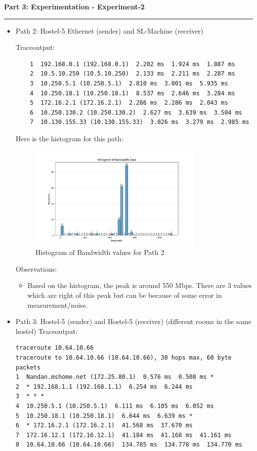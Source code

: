 \documentclass[a4paper,12pt]{article}
\newenvironment{solution}[2][]{%
    \begin{mdframed}[linecolor=blue!70!black, linewidth=2pt, roundcorner=10pt, backgroundcolor=yellow!10!white, skipabove=12pt, skipbelow=12pt]%
        \textbf{\large #2}
        \par\noindent\rule{\textwidth}{0.4pt}
}{
    \end{mdframed}
}
\begin{document}
\begin{solution}{Part 3: Experimentation - Experiment-2}
\begin{itemize}
        \item Path 2: Hostel-5 Ethernet (sender) and SL-Machine (receiver)
        
        Traceoutput:
\begin{verbatim}
    1  192.168.0.1 (192.168.0.1)  2.202 ms  1.924 ms  1.887 ms
    2  10.5.10.250 (10.5.10.250)  2.133 ms  2.211 ms  2.287 ms
    3  10.250.5.1 (10.250.5.1)  2.810 ms  3.001 ms  5.935 ms
    4  10.250.18.1 (10.250.18.1)  8.537 ms  2.646 ms  3.284 ms
    5  172.16.2.1 (172.16.2.1)  2.286 ms  2.286 ms  2.043 ms
    6  10.250.130.2 (10.250.130.2)  2.627 ms  3.639 ms  3.504 ms
    7  10.130.155.33 (10.130.155.33)  3.026 ms  3.279 ms  2.985 ms
\end{verbatim}


Here is the histogram for this path:
\begin{figure}[H]
    \centering
    \includegraphics[width=0.8\textwidth]{histograms/part3-e2-path2}
    \caption{Histogram of Bandwidth values for Path 2}
\end{figure}

Observations:
\begin{itemize}
    \item Based on the histogram, the peak is around 550 Mbps. There are 3 values which are right of this peak but can be because of some error in measurement/noise.
\end{itemize}



\item Path 3: Hostel-5 (sender) and Hostel-5 (receiver) (different rooms in the same hostel)
Traceoutput:
\begin{verbatim}
traceroute 10.64.10.66
traceroute to 10.64.10.66 (10.64.10.66), 30 hops max, 60 byte packets
1  Nandan.mshome.net (172.25.80.1)  0.576 ms  0.508 ms *
2  * 192.168.1.1 (192.168.1.1)  6.254 ms  6.244 ms
3  * * *
4  10.250.5.1 (10.250.5.1)  6.111 ms  6.105 ms  6.052 ms
5  10.250.18.1 (10.250.18.1)  6.644 ms  6.639 ms *
6  * 172.16.2.1 (172.16.2.1)  41.568 ms  37.670 ms
7  172.16.12.1 (172.16.12.1)  41.184 ms  41.168 ms  41.161 ms
8  10.64.10.66 (10.64.10.66)  134.785 ms  134.778 ms  134.770 ms
\end{verbatim}


\end{itemize}
\end{solution}
\end{document}
